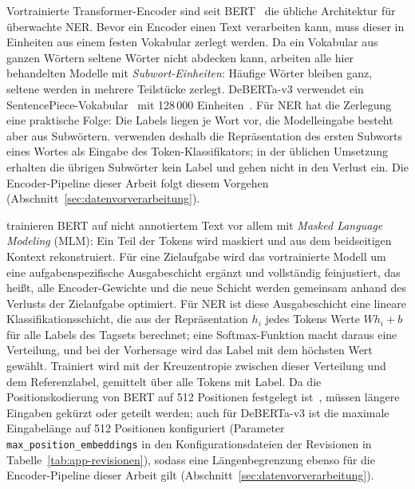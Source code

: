 Vortrainierte Transformer-Encoder sind seit BERT~\cite{devlin2019bert}
die übliche Architektur für überwachte NER.
Bevor ein Encoder einen Text verarbeiten kann, muss dieser in Einheiten
aus einem festen Vokabular zerlegt werden.
Da ein Vokabular aus ganzen Wörtern seltene Wörter nicht abdecken kann,
arbeiten alle hier behandelten Modelle mit \emph{Subwort-Einheiten}:
Häufige Wörter bleiben ganz, seltene werden in mehrere Teilstücke
zerlegt.
DeBERTa-v3 verwendet ein
SentencePiece-Vokabular~\cite{kudo2018sentencepiece} mit
128\,000 Einheiten~\cite{he2021debertav3}.
Für NER hat die Zerlegung eine praktische Folge: Die Labels liegen je
Wort vor, die Modelleingabe besteht aber aus Subwörtern.
\textcite{devlin2019bert} verwenden deshalb die Repräsentation des ersten
Subworts eines Wortes als Eingabe des Token-Klassifikators; in der
üblichen Umsetzung erhalten die übrigen Subwörter kein Label und gehen
nicht in den Verlust ein.
Die Encoder-Pipeline dieser Arbeit folgt diesem Vorgehen
(Abschnitt~\ref{sec:datenvorverarbeitung}).

\textcite{devlin2019bert} trainieren BERT auf nicht annotiertem Text vor allem mit
\emph{Masked Language Modeling} (MLM): Ein Teil der Tokens wird maskiert
und aus dem beidseitigen Kontext rekonstruiert.
Für eine Zielaufgabe wird das vortrainierte Modell um eine
aufgabenspezifische Ausgabeschicht ergänzt und vollständig feinjustiert,
das heißt, alle Encoder-Gewichte und die neue Schicht werden gemeinsam
anhand des Verlusts der Zielaufgabe optimiert.
Für NER ist diese Ausgabeschicht eine lineare Klassifikationsschicht, die
aus der Repräsentation $h_i$ jedes Tokens Werte $W h_i + b$ für alle
Labels des Tagsets berechnet; eine Softmax-Funktion macht daraus eine
Verteilung, und bei der Vorhersage wird das Label mit dem höchsten Wert
gewählt.
Trainiert wird mit der Kreuzentropie zwischen dieser Verteilung und dem
Referenzlabel, gemittelt über alle Tokens mit Label.
Da die Positionskodierung von BERT auf 512 Positionen festgelegt
ist~\cite[Anh.~A.2]{devlin2019bert},
müssen längere Eingaben gekürzt oder geteilt werden; auch für
DeBERTa-v3 ist die maximale Eingabelänge auf 512 Positionen konfiguriert
(Parameter \texttt{max\_position\_embeddings} in den
Konfigurationsdateien der Revisionen in
Tabelle~\ref{tab:app-revisionen}),
sodass eine Längenbegrenzung ebenso für die Encoder-Pipeline dieser Arbeit
gilt (Abschnitt~\ref{sec:datenvorverarbeitung}).

